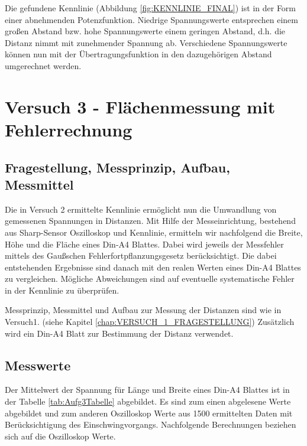 \documentclass[12pt,oneside,a4paper]{report}
\begin{document}
Die gefundene Kennlinie (Abbildung \ref{fig:KENNLINIE_FINAL}) ist in der Form einer abnehmenden Potenzfunktion. Niedrige Spannungswerte entsprechen einem großen Abstand bzw. hohe Spannungswerte einem geringen Abstand, d.h. die Distanz nimmt mit zunehmender Spannung ab. Verschiedene Spannungswerte können nun mit der Übertragungsfunktion in den dazugehörigen Abstand umgerechnet werden.




%
%
\chapter{Versuch 3 - Flächenmessung mit Fehlerrechnung}
\label{chap:VERSUCH_3}



\section{Fragestellung, Messprinzip, Aufbau, Messmittel}
\label{chap:VERSUCH_3_FRAGESTELLUNG}
Die in Versuch 2 ermittelte Kennlinie ermöglicht nun die Umwandlung von gemessenen Spannungen in Distanzen. Mit Hilfe der Messeinrichtung, bestehend aus Sharp-Sensor Oszilloskop und Kennlinie, ermitteln wir nachfolgend die Breite, Höhe und die Fläche eines Din-A4 Blattes. Dabei wird jeweils der Messfehler mittels des Gaußschen Fehlerfortpflanzungsgesetz berücksichtigt. Die dabei entstehenden Ergebnisse sind danach mit den realen Werten eines Din-A4 Blattes zu vergleichen. Mögliche Abweichungen sind auf eventuelle systematische Fehler in der Kennlinie zu überprüfen.

Messprinzip, Messmittel und Aufbau zur Messung der Distanzen sind wie in Versuch1. (siehe Kapitel \ref{chap:VERSUCH_1_FRAGESTELLUNG}) Zusätzlich wird ein Din-A4 Blatt zur Bestimmung der Distanz verwendet.

\section{Messwerte}
\label{chap:VERSUCH_3_MESSWERTE}
Der Mittelwert der Spannung für Länge und Breite eines Din-A4 Blattes ist in der Tabelle \ref{tab:Aufg3Tabelle} abgebildet. Es sind zum einen abgelesene Werte abgebildet und zum anderen Oszilloskop Werte aus 1500 ermittelten Daten mit Berücksichtigung des Einschwingvorgangs. Nachfolgende Berechnungen beziehen sich auf die Oszilloskop Werte.
\end{document}
